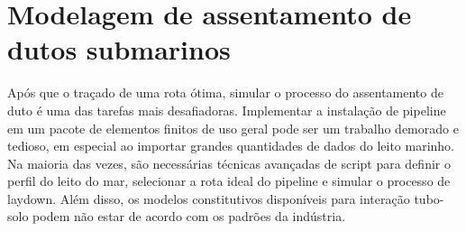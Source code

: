 \chapter{Modelagem de assentamento de dutos submarinos}
\label{chap:assentamento}

Após que o traçado de uma rota ótima, simular o processo do assentamento de duto é uma das tarefas mais desafiadoras. Implementar a instalação de pipeline em um pacote de elementos finitos de uso geral pode ser um trabalho demorado e tedioso, em especial ao importar grandes quantidades de dados do leito marinho. Na maioria das vezes, são necessárias técnicas avançadas de script para definir o perfil do leito do mar, selecionar a rota ideal do pipeline e simular o processo de laydown. Além disso, os modelos constitutivos disponíveis para interação tubo-solo podem não estar de acordo com os padrões da indústria.